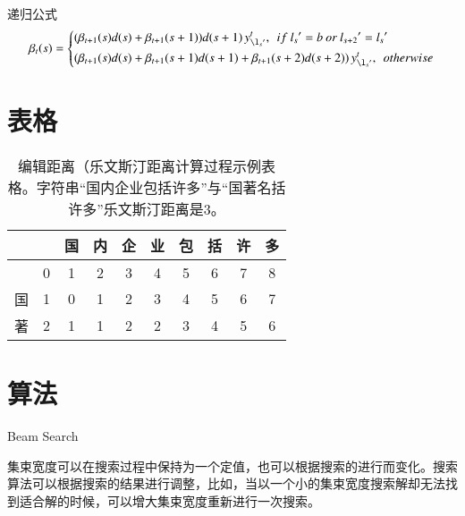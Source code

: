 \documentclass[winfonts]{njuthesis}
\begin{document}
递归公式
\begin{equation}
\beta_t(s)=\left\{
\begin{aligned}
& (\beta_{t+1}(s) d(s)+\beta_{t+1}(s+1))d(s+1)\,  y_{\l_s{}'}^t, \: \: if \:  l_s{}'=b \:  or \:  l_{s+2}{}'=l_s{}'\\
& (\beta_{t+1}(s) d(s)+\beta_{t+1}(s+1)d(s+1)+\beta_{t+1}(s+2)d(s+2))\,  y_{\l_s{}'}^t,\: \:   otherwise
\end{aligned}
\right.
\end{equation}

\section{表格}

\begin{table}[htbp]
\setlength{\belowcaptionskip}{7pt}
  \centering
\begin{tabular}{|c|c|c|c|c|c|c|c|c|c|}
\hline 
  &   & 国 & 内 & 企 & 业 & 包 & 括 & 许 & 多 \\ 
\hline 
  & 0 & 1 & 2 & 3 & 4 & 5 & 6 & 7 & 8 \\ 
\hline 
国 & 1 & 0 & 1 & 2 & 3 & 4 & 5 & 6 & 7 \\ 
\hline 
著 & 2 & 1 & 1 & 2 & 2 & 3 & 4 & 5 & 6 \\ 
\hline
\end{tabular} 
\vspace{0.2cm}
  \caption{编辑距离（乐文斯汀距离计算过程示例表格。字符串``国内企业包括许多''与``国著名括许多''乐文斯汀距离是3。}\label{table:ld}
\end{table}


\section{算法}

\begin{algorithm}
\caption{Beam Search}
\label{alg:beam}
\begin{algorithmic}[1]
\ELSE 
{}
\ENDIF
\ENDWHILE
\end{algorithmic}
\end{algorithm}

集束宽度可以在搜索过程中保持为一个定值，也可以根据搜索的进行而变化。搜索算法可以根据搜索的结果进行调整，比如，当以一个小的集束宽度搜索解却无法找到适合解的时候，可以增大集束宽度重新进行一次搜索。
\end{document}
